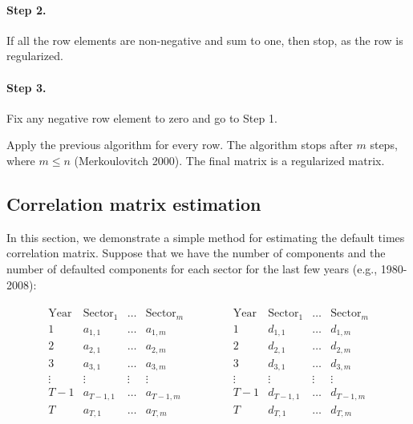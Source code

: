 \documentclass[a4paper,12pt,final]{article}
\begin{document}
\paragraph{Step 2.} If all the row elements are non-negative and sum to one, 
then stop, as the row is regularized.

\paragraph{Step 3.} Fix any negative row element to zero and go to Step 1.
\newline

Apply the previous algorithm for every row. The algorithm stops after $m$ 
steps, where $m \le n$ (Merkoulovitch 2000). The final matrix is a regularized
matrix. 

\subsection{Correlation matrix estimation}
\label{ap:mcorrel}

In this section, we demonstrate a simple method for estimating the default times 
correlation matrix. Suppose that we have the number of components and the 
number of defaulted components for each sector for the last few years (e.g., 
1980-2008):

\begin{center}
\begin{displaymath}
\begin{array}{ccc}
\begin{array}{c|ccc}
\mathrm{Year}     & \mathrm{Sector}_1   & \dots  & \mathrm{Sector}_{m} \\
\hline
1        & a_{1,1}    & \dots  & a_{1,m}    \\
2        & a_{2,1}    & \dots  & a_{2,m}    \\
3        & a_{3,1}    & \dots  & a_{3,m}    \\
\vdots   & \vdots     & \vdots & \vdots     \\
T-1      & a_{T-1,1}  & \dots  & a_{T-1,m}  \\
T        & a_{T,1}    & \dots  & a_{T,m}    \\
\end{array}
& \qquad &
\begin{array}{c|ccc}
\mathrm{Year}     & \mathrm{Sector}_1   & \dots  & \mathrm{Sector}_{m} \\
\hline
1        & d_{1,1}    & \dots  & d_{1,m}    \\
2        & d_{2,1}    & \dots  & d_{2,m}    \\
3        & d_{3,1}    & \dots  & d_{3,m}    \\
\vdots   & \vdots     & \vdots & \vdots     \\
T-1      & d_{T-1,1}  & \dots  & d_{T-1,m}  \\
T        & d_{T,1}    & \dots  & d_{T,m}    \\
\end{array}
\end{array}
\end{displaymath}
\end{center}
\end{document}

